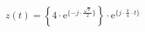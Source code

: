 \correct
\[
z(t) =  \left \{ 4 \cdot \textrm{e}^{\{ -j \cdot \frac{\sqrt{\pi}}{2} \}} \right \} \cdot \textrm{e}^{\{ j \cdot \frac{\pi}{4} \cdot t \}}
\]
